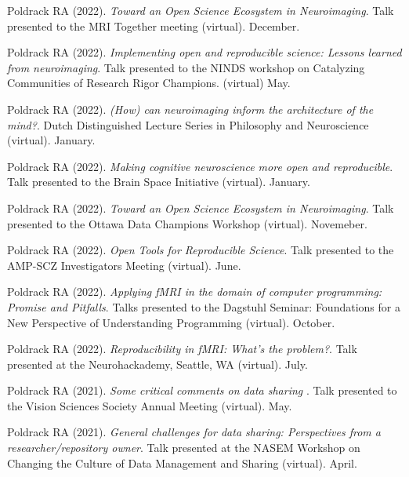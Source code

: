 \documentclass[10pt, letterpaper]{article}
\begin{document}
Poldrack RA (2022). \emph{Toward an Open Science Ecosystem in Neuroimaging}. Talk presented to the MRI Together meeting (virtual). December. \vspace{2mm}

Poldrack RA (2022). \emph{Implementing open and reproducible science: Lessons learned from neuroimaging}. Talk presented to the NINDS workshop on Catalyzing Communities of Research Rigor Champions. (virtual) May. \vspace{2mm}

Poldrack RA (2022). \emph{(How) can neuroimaging inform the architecture of the mind?}. Dutch Distinguished Lecture Series in Philosophy and Neuroscience (virtual). January. \vspace{2mm}

Poldrack RA (2022). \emph{Making cognitive neuroscience more open and reproducible}. Talk presented to the Brain Space Initiative (virtual).  January. \vspace{2mm}

Poldrack RA (2022). \emph{Toward an Open Science Ecosystem in Neuroimaging}. Talk presented to the Ottawa Data Champions Workshop (virtual). Novemeber. \vspace{2mm}

Poldrack RA (2022). \emph{Open Tools for Reproducible Science}. Talk presented to the AMP-SCZ Investigators Meeting (virtual). June. \vspace{2mm}

Poldrack RA (2022). \emph{Applying fMRI in the domain of computer programming:  Promise and Pitfalls}. Talks presented to the Dagstuhl Seminar: Foundations for a New Perspective of Understanding Programming (virtual). October. \vspace{2mm}

Poldrack RA (2022). \emph{Reproducibility in fMRI: What's the problem?}. Talk presented at the Neurohackademy, Seattle, WA (virtual). July. \vspace{2mm}

Poldrack RA (2021). \emph{Some critical comments on data sharing }. Talk presented to the Vision Sciences Society Annual Meeting (virtual). May. \vspace{2mm}

Poldrack RA (2021). \emph{General challenges for data sharing: Perspectives from a researcher/repository owner}. Talk presented at the NASEM Workshop on Changing the Culture of Data Management and Sharing (virtual). April. \vspace{2mm}
\end{document}

